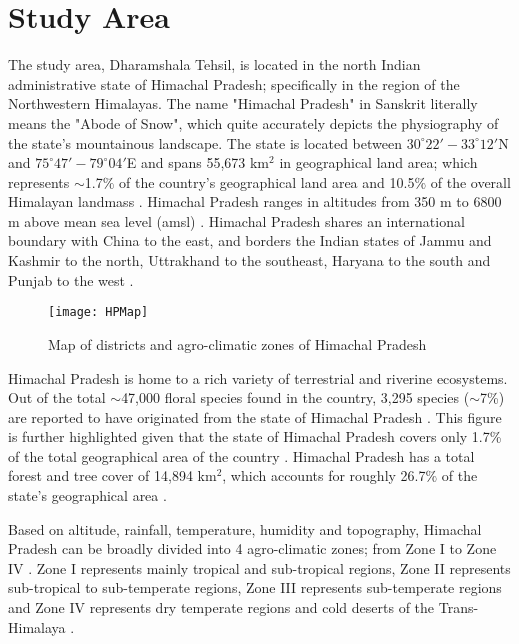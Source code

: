 \clearpage

\section{Study Area}

\justify
The study area, Dharamshala Tehsil, is located in the north Indian administrative state of Himachal Pradesh; specifically in the region of the Northwestern Himalayas. The name "Himachal Pradesh" in Sanskrit literally means the "Abode of Snow", which quite accurately depicts the physiography of the state's mountainous landscape. The state is located between $30^\circ 22' - 33^\circ 12'$N and $75^\circ 47' - 79^\circ04'$E and spans 55,673 km$^2$ in geographical land area; which represents $\sim$1.7$\%$ of the country's geographical land area and 10.5$\%$ of the overall Himalayan landmass . Himachal Pradesh ranges in altitudes from 350 m to 6800 m above mean sea level (\ac{amsl}) . Himachal Pradesh shares an international boundary with China to the east, and borders the Indian states of Jammu and Kashmir to the north, Uttrakhand to the southeast, Haryana to the south and Punjab to the west \citep{Kumar2014}.

\begin{figure}[H]
	\centering
	\texttt{[image: HPMap]}
	\caption{Map of districts and agro-climatic zones of Himachal Pradesh \citep{Kumar2014}} \label{Fig0}
\end{figure}
\vspace{-12pt}

\justify
Himachal Pradesh is home to a rich variety of terrestrial and riverine ecosystems. Out of the total $\sim$47,000 floral species found in the country, 3,295 species ($\sim$7\%) are reported to have originated from the state of Himachal Pradesh . This figure is further highlighted given that the state of Himachal Pradesh covers only 1.7\% of the total geographical area of the country . Himachal Pradesh has a total forest and tree cover of 14,894 km$^2$, which accounts for roughly 26.7$\%$ of the state's geographical area . 

\justify
Based on altitude, rainfall, temperature, humidity and topography, Himachal Pradesh can be broadly divided into 4 agro-climatic zones; from Zone I to Zone IV \citep{Kumar2014}. Zone I represents mainly tropical and sub-tropical regions, Zone II represents sub-tropical to sub-temperate regions, Zone III represents sub-temperate regions and Zone IV represents dry temperate regions and cold deserts of the Trans-Himalaya \citep{Kumar2014}.


